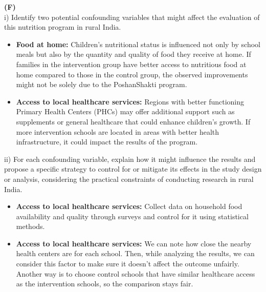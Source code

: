 \documentclass{article}
\begin{document}
\noindent\textbf{(F)}\\
i) Identify two potential confounding variables that might affect the
evaluation of
this nutrition program in rural India.
\begin{itemize}
    \item \textbf{Food at home:}
          Children's nutritional status is influenced not only by school meals
          but
          also by the quantity and quality of food they receive at home. If
          families in
          the intervention group have better access to nutritious food at home
          compared
          to those in the control group, the observed improvements might not be
          solely
          due to the PoshanShakti program.
    \item \textbf{Access to local healthcare services:}
          Regions with better functioning Primary Health Centers (PHCs) may
          offer
          additional support such as supplements or general healthcare that
          could enhance
          children's growth. If more intervention schools are located in areas
          with
          better health infrastructure, it could impact the results of the
          program.
\end{itemize}
ii) For each confounding variable, explain how it might influence the results
and
propose a specific strategy to control for or mitigate its effects in the study
design or analysis, considering the practical constraints of conducting
research
in rural India.
\begin{itemize}
    \item \textbf{Access to local healthcare services:}
          Collect data on household food availability and quality through
          surveys and control for it using statistical methods.
    \item \textbf{Access to local healthcare services:}
    We can note how close the nearby health centers are for each school. Then, while analyzing the results, we can consider this factor to make sure it doesn't affect the outcome unfairly. Another way is to choose control schools that have similar healthcare access as the intervention schools, so the comparison stays fair.
\end{itemize}
\end{document}
